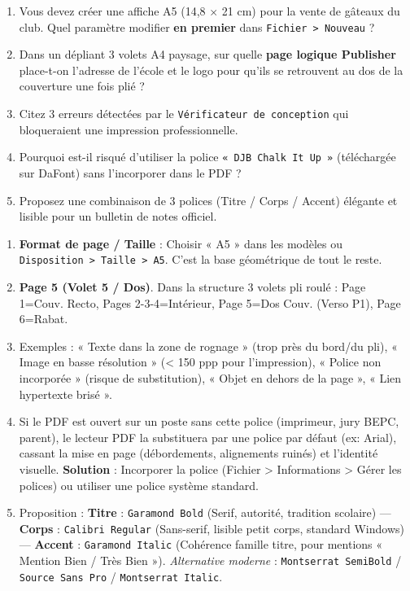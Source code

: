\documentclass[11pt]{article}
\begin{document}
\begin{exercice}
\begin{enumerate}
    \item Vous devez créer une affiche A5 (14,8 $\times$ 21 cm) pour la vente de gâteaux du club. Quel paramètre modifier \textbf{en premier} dans \texttt{Fichier > Nouveau} ?
    \item Dans un dépliant 3 volets A4 paysage, sur quelle \textbf{page logique Publisher} place-t-on l'adresse de l'école et le logo pour qu'ils se retrouvent au dos de la couverture une fois plié ?
    \item Citez 3 erreurs détectées par le \texttt{Vérificateur de conception} qui bloqueraient une impression professionnelle.
    \item Pourquoi est-il risqué d'utiliser la police \texttt{« DJB Chalk It Up »} (téléchargée sur DaFont) sans l'incorporer dans le PDF ?
    \item Proposez une combinaison de 3 polices (Titre / Corps / Accent) élégante et lisible pour un bulletin de notes officiel.
\end{enumerate}
\end{exercice}

\begin{corrige}
\begin{enumerate}
    \item \textbf{Format de page / Taille} : Choisir « A5 » dans les modèles ou \texttt{Disposition > Taille > A5}. C'est la base géométrique de tout le reste.
    \item \textbf{Page 5 (Volet 5 / Dos)}. Dans la structure 3 volets pli roulé : Page 1=Couv. Recto, Pages 2-3-4=Intérieur, Page 5=Dos Couv. (Verso P1), Page 6=Rabat.
    \item Exemples : « Texte dans la zone de rognage » (trop près du bord/du pli), « Image en basse résolution » (< 150 ppp pour l'impression), « Police non incorporée » (risque de substitution), « Objet en dehors de la page », « Lien hypertexte brisé ».
    \item Si le PDF est ouvert sur un poste sans cette police (imprimeur, jury BEPC, parent), le lecteur PDF la substituera par une police par défaut (ex: Arial), cassant la mise en page (débordements, alignements ruinés) et l'identité visuelle. \textbf{Solution} : Incorporer la police (Fichier > Informations > Gérer les polices) ou utiliser une police système standard.
    \item Proposition : \textbf{Titre} : \texttt{Garamond Bold} (Serif, autorité, tradition scolaire) — \textbf{Corps} : \texttt{Calibri Regular} (Sans-serif, lisible petit corps, standard Windows) — \textbf{Accent} : \texttt{Garamond Italic} (Cohérence famille titre, pour mentions « Mention Bien / Très Bien »). \emph{Alternative moderne} : \texttt{Montserrat SemiBold} / \texttt{Source Sans Pro} / \texttt{Montserrat Italic}.
\end{enumerate}
\end{corrige}
\end{document}
